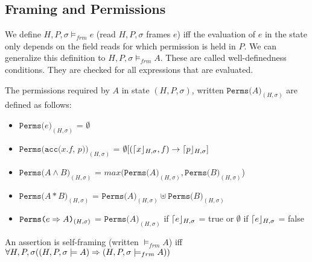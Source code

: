 \subsection{Framing and Permissions}
\begin{mytitle}[Framing] We define $H, P, \sigma \models_{frm} e$ (read $H, P, \sigma$ frames $e$) iff the evaluation of $e$ in the state only depends on the field reads for which permission is held in $P$. We can generalize this definition to $H, P, \sigma \models_{frm} A$. These are called well-definedness conditions. They are checked for all expressions that are evaluated.
\end{mytitle}
\begin{mytitle} The permissions required by $A$ in state $(H, P, \sigma)$, written $\texttt{Perms($A$)}_{(H, \sigma)}$ are defined as follows:
\begin{itemize}
    \item $\texttt{Perms($e$)}_{(H, \sigma)}$ = $\emptyset$
    \item $\texttt{Perms(acc($x$.$f$, $p$))}_{(H, \sigma)}$ = $\emptyset[(\lceil x\rfloor_{H, \sigma}, f) \to \lceil p\rfloor_{H, \sigma}]$
    \item $\texttt{Perms($A\land B$)}_{(H, \sigma)}$ = $max(\texttt{Perms($A$)}_{(H, \sigma)}, \texttt{Perms($B$)}_{(H, \sigma)}$)
    \item $\texttt{Perms($A*B$)}_{(H, \sigma)}$ = $\texttt{Perms($A$)}_{(H, \sigma)} \uplus \texttt{Perms($B$)}_{(H, \sigma)}$
    \item $\texttt{Perms($e \Rightarrow A$)}_{(H, \sigma)}$ = $\texttt{Perms($A$)}_{(H, \sigma)}$ if $\lceil e\rfloor_{H,\sigma}$ = true or $\emptyset$ if $\lceil e\rfloor_{H,\sigma}$ = false
\end{itemize}
\end{mytitle}
\begin{mytitle} An assertion is self-framing (written $\models_{frm} A$) iff $\forall H, P, \sigma((H, P, \sigma \models A) \Rightarrow (H, P, \sigma \models_{frm} A))$
\end{mytitle}

